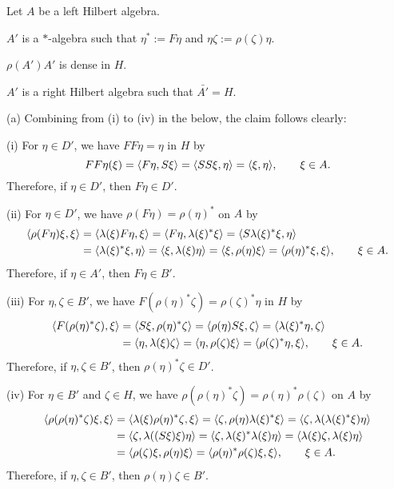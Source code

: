 \documentclass{../../small}
\begin{document}
\begin{prop}
Let $A$ be a left Hilbert algebra.
\begin{parts}
\item $A'$ is a $*$-algebra such that $\eta^*:=F\eta$ and $\eta\zeta:=\rho(\zeta)\eta$.
\item $\rho(A')A'$ is dense in $H$.
\item $A'$ is a right Hilbert algebra such that $\bar{A'}=H$.
\end{parts}
\end{prop}
\begin{pf}
(a)
Combining from (i) to (iv) in the below, the claim follows clearly:

(i)
For $\eta\in D'$, we have $FF\eta=\eta$ in $H$ by
\[FF\eta(\xi)=\langle F\eta,S\xi\rangle=\langle SS\xi,\eta\rangle=\langle\xi,\eta\rangle,\qquad\xi\in A.\]
Therefore, if $\eta\in D'$, then $F\eta\in D'$.

(ii)
For $\eta\in D'$, we have $\rho(F\eta)=\rho(\eta)^*$ on $A$ by
\begin{align*}
\langle\rho(F\eta)\xi,\xi\rangle
&=\langle\lambda(\xi)F\eta,\xi\rangle
=\langle F\eta,\lambda(\xi)^*\xi\rangle
=\langle S\lambda(\xi)^*\xi,\eta\rangle\\
&=\langle\lambda(\xi)^*\xi,\eta\rangle
=\langle\xi,\lambda(\xi)\eta\rangle
=\langle\xi,\rho(\eta)\xi\rangle
=\langle\rho(\eta)^*\xi,\xi\rangle
,\qquad\xi\in A.
\end{align*}
Therefore, if $\eta\in A'$, then $F\eta\in B'$.

(iii)
For $\eta,\zeta\in B'$, we have $F(\rho(\eta)^*\zeta)=\rho(\zeta)^*\eta$ in $H$ by
\begin{align*}
\langle F(\rho(\eta)^*\zeta),\xi\rangle
&=\langle S\xi,\rho(\eta)^*\zeta\rangle
=\langle\rho(\eta)S\xi,\zeta\rangle
=\langle\lambda(\xi)^*\eta,\zeta\rangle\\
&=\langle\eta,\lambda(\xi)\zeta\rangle
=\langle\eta,\rho(\zeta)\xi\rangle
=\langle\rho(\zeta)^*\eta,\xi\rangle
,\qquad\xi\in A.
\end{align*}
Therefore, if $\eta,\zeta\in B'$, then $\rho(\eta)^*\zeta\in D'$.

(iv)
For $\eta\in B'$ and $\zeta\in H$, we have $\rho(\rho(\eta)^*\zeta)=\rho(\eta)^*\rho(\zeta)$ on $A$ by
\begin{align*}
\langle\rho(\rho(\eta)^*\zeta)\xi,\xi\rangle
&=\langle\lambda(\xi)\rho(\eta)^*\zeta,\xi\rangle
=\langle\zeta,\rho(\eta)\lambda(\xi)^*\xi\rangle
=\langle\zeta,\lambda(\lambda(\xi)^*\xi)\eta\rangle\\
&=\langle\zeta,\lambda((S\xi)\xi)\eta\rangle
=\langle\zeta,\lambda(\xi)^*\lambda(\xi)\eta\rangle
=\langle\lambda(\xi)\zeta,\lambda(\xi)\eta\rangle\\
&=\langle\rho(\zeta)\xi,\rho(\eta)\xi\rangle
=\langle\rho(\eta)^*\rho(\zeta)\xi,\xi\rangle
,\qquad\xi\in A.
\end{align*}
Therefore, if $\eta,\zeta\in B'$, then $\rho(\eta)\zeta\in B'$.



\end{pf}
\end{document}
